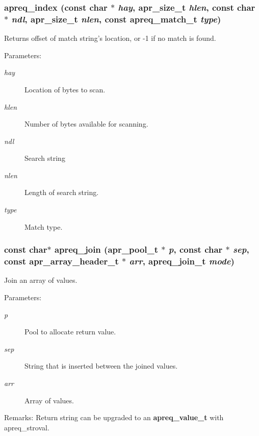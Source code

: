 \subsubsection{ apreq\_\-index (const char $\ast$ {\em hay}, {\bf apr\_\-size\_\-t} {\em hlen}, const char $\ast$ {\em ndl}, {\bf apr\_\-size\_\-t} {\em nlen}, const {\bf apreq\_\-match\_\-t} {\em type})}\label{group__Utils_a9}


Returns offset of match string's location, or -1 if no match is found. \begin{Desc}
\item[Parameters:]
\begin{description}
\item[{\em hay}]Location of bytes to scan. \item[{\em hlen}]Number of bytes available for scanning. \item[{\em ndl}]Search string \item[{\em nlen}]Length of search string. \item[{\em type}]Match type. \end{description}
\end{Desc}
\subsubsection{\setlength{\rightskip}{0pt plus 5cm}const char$\ast$ apreq\_\-join ({\bf apr\_\-pool\_\-t} $\ast$ {\em p}, const char $\ast$ {\em sep}, const {\bf apr\_\-array\_\-header\_\-t} $\ast$ {\em arr}, {\bf apreq\_\-join\_\-t} {\em mode})}\label{group__Utils_a7}


Join an array of values. \begin{Desc}
\item[Parameters:]
\begin{description}
\item[{\em p}]Pool to allocate return value. \item[{\em sep}]String that is inserted between the joined values. \item[{\em arr}]Array of values. \end{description}
\end{Desc}
\begin{Desc}
\item[Remarks:]Return string can be upgraded to an {\bf apreq\_\-value\_\-t} with apreq\_\-stroval. \end{Desc}

